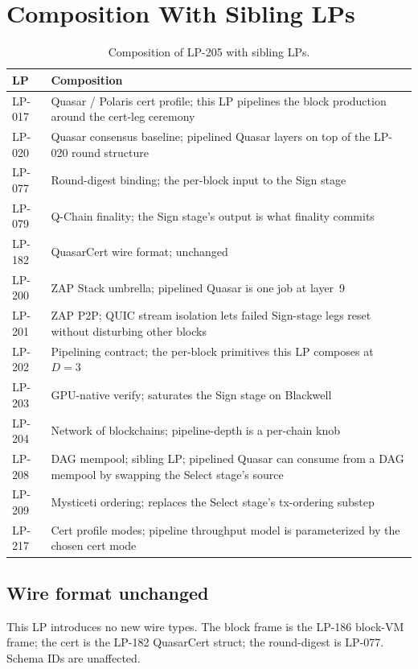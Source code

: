 \section{Composition With Sibling LPs}

\begin{table}[h]
\centering
\small
\begin{tabular}{@{}lp{9cm}@{}}
\toprule
\textbf{LP} & \textbf{Composition} \\
\midrule
LP-017 & Quasar / Polaris cert profile; this LP pipelines the block production around the cert-leg ceremony \\
LP-020 & Quasar consensus baseline; pipelined Quasar layers on top of the LP-020 round structure \\
LP-077 & Round-digest binding; the per-block input to the Sign stage \\
LP-079 & Q-Chain finality; the Sign stage's output is what finality commits \\
LP-182 & QuasarCert wire format; unchanged \\
LP-200 & ZAP Stack umbrella; pipelined Quasar is one job at layer~9 \\
LP-201 & ZAP P2P; QUIC stream isolation lets failed Sign-stage legs reset without disturbing other blocks \\
LP-202 & Pipelining contract; the per-block primitives this LP composes at $D{=}3$ \\
LP-203 & GPU-native verify; saturates the Sign stage on Blackwell \\
LP-204 & Network of blockchains; pipeline-depth is a per-chain knob \\
LP-208 & DAG mempool; sibling LP; pipelined Quasar can consume from a DAG mempool by swapping the Select stage's source \\
LP-209 & Mysticeti ordering; replaces the Select stage's tx-ordering substep \\
LP-217 & Cert profile modes; pipeline throughput model is parameterized by the chosen cert mode \\
\bottomrule
\end{tabular}
\caption{Composition of LP-205 with sibling LPs.}
\label{tab:composition}
\end{table}

\subsection{Wire format unchanged}

This LP introduces no new wire types. The block frame is the LP-186
block-VM frame; the cert is the LP-182 QuasarCert struct; the
round-digest is LP-077. Schema IDs are unaffected.

